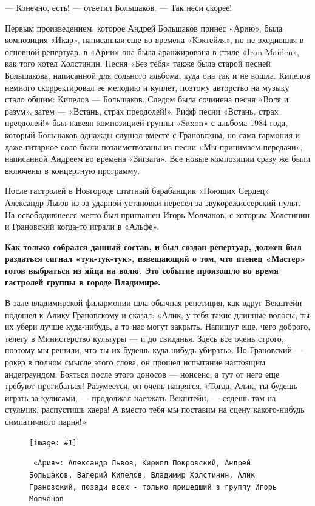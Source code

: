 \documentclass[10pt, twoside]{book}
\newcommand{\myincludegraphics}[1]{\texttt{[image: \#1]}}
\begin{document}
— Конечно, есть! — ответил Большаков.
— Так неси скорее!

Первым произведением, которое Андрей Большаков принес «Арию», была композиция «Икар», написанная еще во времена
«Коктейля», но не входившая в основной репертуар. в «Арии» она была аранжирована в стиле «Iron Maiden», как того хотел
Холстинин. Песня «Без тебя» также была старой песней Большакова, написанной для сольного альбома, куда она так и не
вошла. Кипелов немного скорректировал ее мелодию и куплет, поэтому авторство на музыку стало общим: Кипелов — Большаков.
Следом была сочинена песня «Воля и разум», затем — «Встань, страх преодолей!». Рифф песни «Встань, страх преодолей!» был
навеян композицией группы «Saxon» с альбома 1984 года, который Большаков однажды слушал вместе с Грановским, но сама
гармония и даже гитарное соло были позаимствованы из песни «Мы принимаем передачи», написанной Андреем во времена
«Зигзага». Все новые композиции сразу же были включены в концертную программу.

После гастролей в Новгороде штатный барабанщик «Пoющих Сердец» Александр Львов из-за ударной установки пересел за
звукорежиссерский пульт. На освободившееся место был приглашен Игорь Молчанов, с которым Холстинин и Грановский когда-то
играли в «Альфе».

\textbf{Как только собрался данный состав, и был создан репертуар, должен был раздаться сигнал «тук-тук-тук», извещающий
о том, что птенец «Мастер» готов выбраться из яйца на волю. Это событие произошло во время гастролей группы в городе
Владимире.}

В зале владимирской филармонии шла обычная репетиция, как вдруг Векштейн подошел к Алику Грановскому и сказал: «Алик, у
тебя такие длинные волосы, ты их убери лучше куда-нибудь, а то нас могут закрыть. Напишут еще, чего доброго, телегу в
Министерство культуры — и до свиданья. Здесь все очень строго, поэтому мы решили, что ты их будешь куда-нибудь убирать».
Но Грановский — рокер в полном смысле этого слова, он прошел испытание настоящим андеграундом. Бояться после этого
доносов — нонсенс, а тут от него еще требуют прогибаться! Разумеется, он очень напрягся. «Тогда, Алик, ты будешь играть
за кулисами, — продолжал наезжать Векштейн, — сядешь там на стульчик, распустишь хаера! А вместо тебя мы поставим на
сцену какого-нибудь симпатичного парня!»

\begin{figure}[h]
    \centering
    \myincludegraphics{Image14}
    \caption{\texttt{
        «Ария»: Александр Львов, Кирилл Покровский, Андрей Большаков, Валерий Кипелов, Владимир Холстинин, Алик
        Грановский, позади всех - только пришедший в группу Игорь Молчанов
    }}
\end{figure}
\end{document}
